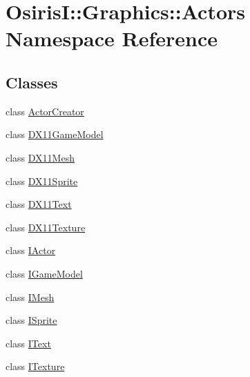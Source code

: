 \hypertarget{namespace_osiris_i_1_1_graphics_1_1_actors}{\section{Osiris\-I\-:\-:Graphics\-:\-:Actors Namespace Reference}
\label{namespace_osiris_i_1_1_graphics_1_1_actors}
}
\subsection*{Classes}
\begin{DoxyCompactItemize}
\item 
class \hyperlink{class_osiris_i_1_1_graphics_1_1_actors_1_1_actor_creator}{Actor\-Creator}
\item 
class \hyperlink{class_osiris_i_1_1_graphics_1_1_actors_1_1_d_x11_game_model}{D\-X11\-Game\-Model}
\item 
class \hyperlink{class_osiris_i_1_1_graphics_1_1_actors_1_1_d_x11_mesh}{D\-X11\-Mesh}
\item 
class \hyperlink{class_osiris_i_1_1_graphics_1_1_actors_1_1_d_x11_sprite}{D\-X11\-Sprite}
\item 
class \hyperlink{class_osiris_i_1_1_graphics_1_1_actors_1_1_d_x11_text}{D\-X11\-Text}
\item 
class \hyperlink{class_osiris_i_1_1_graphics_1_1_actors_1_1_d_x11_texture}{D\-X11\-Texture}
\item 
class \hyperlink{class_osiris_i_1_1_graphics_1_1_actors_1_1_i_actor}{I\-Actor}
\item 
class \hyperlink{class_osiris_i_1_1_graphics_1_1_actors_1_1_i_game_model}{I\-Game\-Model}
\item 
class \hyperlink{class_osiris_i_1_1_graphics_1_1_actors_1_1_i_mesh}{I\-Mesh}
\item 
class \hyperlink{class_osiris_i_1_1_graphics_1_1_actors_1_1_i_sprite}{I\-Sprite}
\item 
class \hyperlink{class_osiris_i_1_1_graphics_1_1_actors_1_1_i_text}{I\-Text}
\item 
class \hyperlink{class_osiris_i_1_1_graphics_1_1_actors_1_1_i_texture}{I\-Texture}
\end{DoxyCompactItemize}
